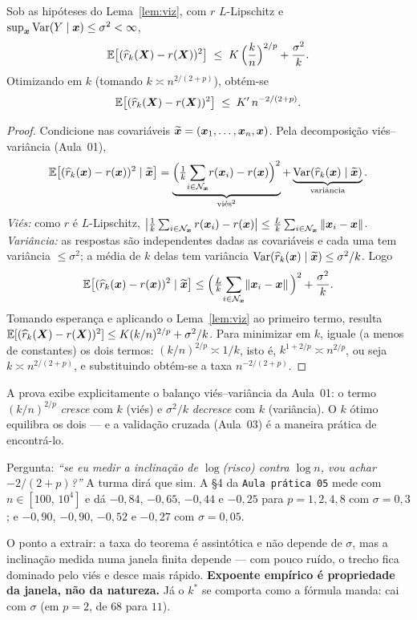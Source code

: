 \documentclass[11pt,a4paper]{article}
\begin{document}
\begin{teorema}\label{teo:knn}
Sob as hipóteses do Lema~\ref{lem:viz}, com $r$ $L$-Lipschitz e
$\sup_{\bm{x}}\operatorname{Var}(Y\mid\bm{x})\le\sigma^2<\infty$,
\[
  \mathbb{E}\big[(\widehat{r}_k(\bm{X})-r(\bm{X}))^2\big]
   \;\le\; K\,\Big(\frac{k}{n}\Big)^{2/p} + \frac{\sigma^2}{k}.
\]
Otimizando em $k$ (tomando $k \asymp n^{2/(2+p)}$), obtém-se
\[
  \mathbb{E}\big[(\widehat{r}_k(\bm{X})-r(\bm{X}))^2\big] \;\le\; K'\, n^{-2/(2+p)}.
\]
\end{teorema}
\begin{proof}
Condicione nas covariáveis $\widetilde{\bm{x}}=(\bm{x}_1,\dots,\bm{x}_n,\bm{x})$. Pela decomposição
viés--variância (Aula~01),
\[
  \mathbb{E}\big[(\widehat{r}_k(\bm{x})-r(\bm{x}))^2\mid\widetilde{\bm{x}}\big]
  = \underbrace{\Big(\tfrac1k\!\sum_{i\in\mathcal{N}_{\bm{x}}}\! r(\bm{x}_i)-r(\bm{x})\Big)^2}_{\text{viés}^2}
  + \underbrace{\operatorname{Var}(\widehat{r}_k(\bm{x})\mid\widetilde{\bm{x}})}_{\text{variância}}.
\]
\emph{Viés:} como $r$ é $L$-Lipschitz,
$\big|\tfrac1k\sum_{i\in\mathcal{N}_{\bm{x}}}r(\bm{x}_i)-r(\bm{x})\big|
\le \tfrac{L}{k}\sum_{i\in\mathcal{N}_{\bm{x}}}\left\lVert \bm{x}_i-\bm{x} \right\rVert$.
\emph{Variância:} as respostas são independentes dadas as covariáveis e cada uma
tem variância $\le\sigma^2$; a média de $k$ delas tem variância
$\operatorname{Var}(\widehat{r}_k(\bm{x})\mid\widetilde{\bm{x}})\le \sigma^2/k$. Logo
\[
  \mathbb{E}\big[(\widehat{r}_k(\bm{x})-r(\bm{x}))^2\mid\widetilde{\bm{x}}\big]
  \le \Big(\tfrac{L}{k}\!\sum_{i\in\mathcal{N}_{\bm{x}}}\!\left\lVert \bm{x}_i-\bm{x} \right\rVert\Big)^2 + \frac{\sigma^2}{k}.
\]
Tomando esperança e aplicando o Lema~\ref{lem:viz} ao primeiro termo, resulta
$\mathbb{E}[(\widehat{r}_k(\bm{X})-r(\bm{X}))^2]\le K(k/n)^{2/p}+\sigma^2/k$. Para minimizar em $k$,
iguale (a menos de constantes) os dois termos: $(k/n)^{2/p}\asymp 1/k$, isto é,
$k^{1+2/p}\asymp n^{2/p}$, ou seja $k\asymp n^{2/(2+p)}$, e substituindo obtém-se
a taxa $n^{-2/(2+p)}$.
\end{proof}

\begin{ideia}
A prova exibe explicitamente o balanço viés--variância da Aula~01: o termo
$(k/n)^{2/p}$ \emph{cresce} com $k$ (viés) e $\sigma^2/k$ \emph{decresce} com $k$
(variância). O $k$ ótimo equilibra os dois --- e a validação cruzada (Aula~03) é a
maneira prática de encontrá-lo.
\end{ideia}

\begin{emsala}
Pergunta: \emph{``se eu medir a inclinação de $\log$(risco) contra $\log n$, vou
achar $-2/(2+p)$?''} A turma dirá que sim. A §4 da \texttt{Aula prática 05} mede com
$n\in[100,\,10^4]$ e dá $-0{,}84$, $-0{,}65$, $-0{,}44$ e $-0{,}25$ para
$p=1,2,4,8$ com $\sigma=0{,}3$; e $-0{,}90$, $-0{,}90$, $-0{,}52$ e $-0{,}27$ com
$\sigma=0{,}05$.

O ponto a extrair: a taxa do teorema é assintótica e não depende de $\sigma$, mas a
inclinação medida numa janela finita depende --- com pouco ruído, o trecho fica
dominado pelo viés e desce mais rápido. \textbf{Expoente empírico é propriedade da
janela, não da natureza.} Já o $k^*$ se comporta como a fórmula manda: cai com
$\sigma$ (em $p=2$, de $68$ para $11$).
\end{emsala}
\end{document}
